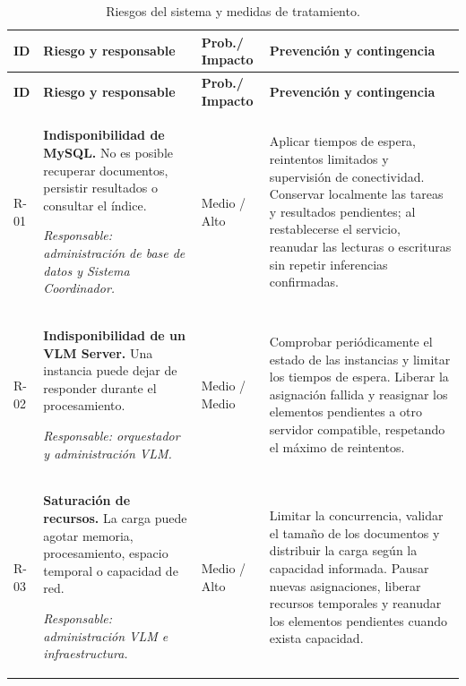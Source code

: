 \begin{longtable}{
    >{\raggedright\arraybackslash}p{}
    >{\raggedright\arraybackslash}p{}
    >{\centering\arraybackslash}p{}
    >{\raggedright\arraybackslash}p{}
}
\caption{Riesgos del sistema y medidas de tratamiento.}
\label{tab:riesgos_sistema}\\

\toprule
\textbf{ID} & \textbf{Riesgo y responsable} & \textbf{Prob./ Impacto} & \textbf{Prevención y contingencia} \\
\midrule
\endfirsthead

\toprule
\textbf{ID} & \textbf{Riesgo y responsable} & \textbf{Prob./ Impacto} & \textbf{Prevención y contingencia} \\
\midrule
\endhead

\bottomrule
\endfoot

R-01 &
\textbf{Indisponibilidad de MySQL.} No es posible recuperar documentos, persistir resultados o consultar el índice.

\textit{Responsable: administración de base de datos y Sistema Coordinador.}
& Medio / Alto &
Aplicar tiempos de espera, reintentos limitados y supervisión de conectividad. Conservar localmente las tareas y resultados pendientes; al restablecerse el servicio, reanudar las lecturas o escrituras sin repetir inferencias confirmadas.
\\

R-02 &
\textbf{Indisponibilidad de un VLM Server.} Una instancia puede dejar de responder durante el procesamiento.

\textit{Responsable: orquestador y administración VLM.}
& Medio / Medio &
Comprobar periódicamente el estado de las instancias y limitar los tiempos de espera. Liberar la asignación fallida y reasignar los elementos pendientes a otro servidor compatible, respetando el máximo de reintentos.
\\

R-03 &
\textbf{Saturación de recursos.} La carga puede agotar memoria, procesamiento, espacio temporal o capacidad de red.

\textit{Responsable: administración VLM e infraestructura.}
& Medio / Alto &
Limitar la concurrencia, validar el tamaño de los documentos y distribuir la carga según la capacidad informada. Pausar nuevas asignaciones, liberar recursos temporales y reanudar los elementos pendientes cuando exista capacidad.
\\


\end{longtable}
